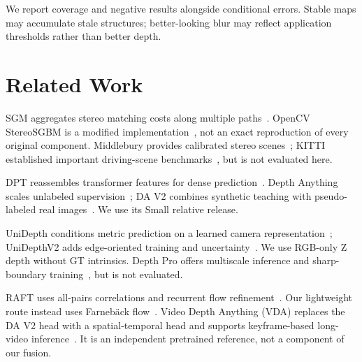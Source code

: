 \documentclass[10pt,twocolumn,letterpaper]{article}
\begin{document}
We report coverage and negative results alongside conditional errors. Stable maps may accumulate stale structures; better-looking blur may reflect application thresholds rather than better depth.

\section{Related Work}
SGM aggregates stereo matching costs along multiple paths~\cite{sgm}. OpenCV StereoSGBM is a modified implementation~\cite{opencv}, not an exact reproduction of every original component. Middlebury provides calibrated stereo scenes~\cite{middlebury}; KITTI established important driving-scene benchmarks~\cite{kitti}, but is not evaluated here.

DPT reassembles transformer features for dense prediction~\cite{dpt}. Depth Anything scales unlabeled supervision~\cite{dav1}; DA V2 combines synthetic teaching with pseudo-labeled real images~\cite{dav2}. We use its Small relative release.

UniDepth conditions metric prediction on a learned camera representation~\cite{unidepth}; UniDepthV2 adds edge-oriented training and uncertainty~\cite{unidepthv2}. We use RGB-only Z depth without GT intrinsics. Depth Pro offers multiscale inference and sharp-boundary training~\cite{depthpro}, but is not evaluated.

RAFT uses all-pairs correlations and recurrent flow refinement~\cite{raft}. Our lightweight route instead uses Farneb\"ack flow~\cite{farneback}. Video Depth Anything (VDA) replaces the DA V2 head with a spatial-temporal head and supports keyframe-based long-video inference~\cite{vda}. It is an independent pretrained reference, not a component of our fusion.

\begin{center}\begin{minipage}{\linewidth}\centering
{}
\end{minipage}\end{center}
\end{document}
